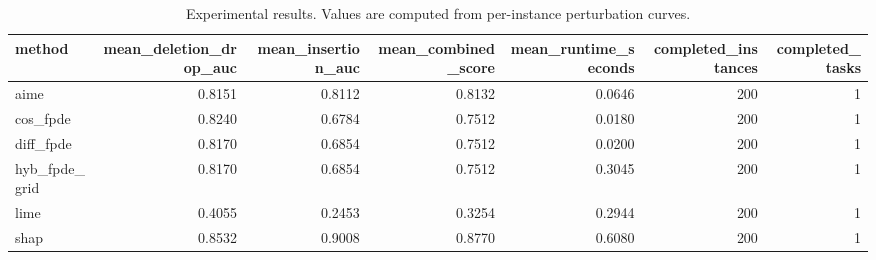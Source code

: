 \begin{table}[t]
\caption{Experimental results. Values are computed from per-instance perturbation curves.}
\label{tab:main_results_computed}
\centering
\begin{tabular}{lrrrrrr}
\toprule
method & mean\_deletion\_drop\_auc & mean\_insertion\_auc & mean\_combined\_score & mean\_runtime\_seconds & completed\_instances & completed\_tasks \\
\midrule
aime & 0.8151 & 0.8112 & 0.8132 & 0.0646 & 200 & 1 \\
cos\_fpde & 0.8240 & 0.6784 & 0.7512 & 0.0180 & 200 & 1 \\
diff\_fpde & 0.8170 & 0.6854 & 0.7512 & 0.0200 & 200 & 1 \\
hyb\_fpde\_grid & 0.8170 & 0.6854 & 0.7512 & 0.3045 & 200 & 1 \\
lime & 0.4055 & 0.2453 & 0.3254 & 0.2944 & 200 & 1 \\
shap & 0.8532 & 0.9008 & 0.8770 & 0.6080 & 200 & 1 \\
\bottomrule
\end{tabular}

\end{table}
